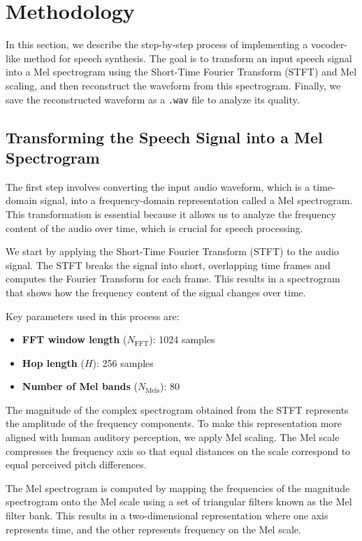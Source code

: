 \documentclass[12pt]{article}
\begin{document}
\section{Methodology}

In this section, we describe the step-by-step process of implementing a vocoder-like method for speech synthesis. The goal is to transform an input speech signal into a Mel spectrogram using the Short-Time Fourier Transform (STFT) and Mel scaling, and then reconstruct the waveform from this spectrogram. Finally, we save the reconstructed waveform as a \texttt{.wav} file to analyze its quality.

\subsection{Transforming the Speech Signal into a Mel Spectrogram}

The first step involves converting the input audio waveform, which is a time-domain signal, into a frequency-domain representation called a Mel spectrogram. This transformation is essential because it allows us to analyze the frequency content of the audio over time, which is crucial for speech processing.

We start by applying the Short-Time Fourier Transform (STFT) to the audio signal. The STFT breaks the signal into short, overlapping time frames and computes the Fourier Transform for each frame. This results in a spectrogram that shows how the frequency content of the signal changes over time.

Key parameters used in this process are:

\begin{itemize}
    \item \textbf{FFT window length} (\(N_{\text{FFT}}\)): 1024 samples
    \item \textbf{Hop length} (\(H\)): 256 samples
    \item \textbf{Number of Mel bands} (\(N_{\text{Mels}}\)): 80
\end{itemize}

The magnitude of the complex spectrogram obtained from the STFT represents the amplitude of the frequency components. To make this representation more aligned with human auditory perception, we apply Mel scaling. The Mel scale compresses the frequency axis so that equal distances on the scale correspond to equal perceived pitch differences.

The Mel spectrogram is computed by mapping the frequencies of the magnitude spectrogram onto the Mel scale using a set of triangular filters known as the Mel filter bank. This results in a two-dimensional representation where one axis represents time, and the other represents frequency on the Mel scale.
\end{document}
